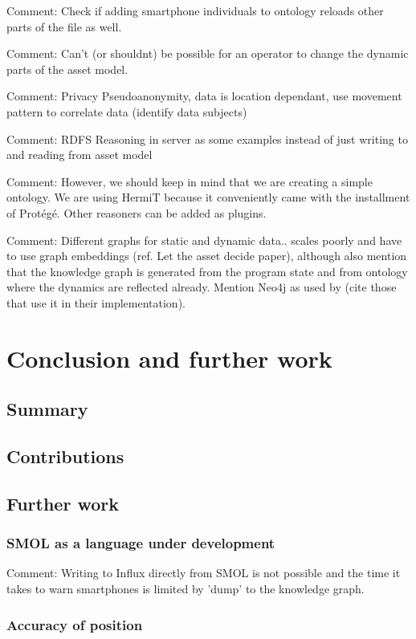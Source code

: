 \documentclass{article}
\begin{document}
Comment: Check if adding smartphone individuals to ontology reloads other parts of the file as well.

Comment: Can't (or shouldnt) be possible for an operator to change the dynamic parts of the asset model.

Comment: Privacy
    Pseudoanonymity, data is location dependant, use movement pattern to correlate data (identify data subjects)


Comment: RDFS Reasoning in server as some examples instead of just writing to and reading from asset model

Comment: However, we should keep in mind that we are creating a simple ontology. We are using HermiT because it conveniently came with the installment of Protégé. Other reasoners can be added as plugins.

Comment: Different graphs for static and dynamic data.. scales poorly and have to use graph embeddings (ref. Let the asset decide paper), although also mention that the knowledge graph is generated from the program state and from ontology where the dynamics are reflected already. Mention Neo4j as used by (cite those that use it in their implementation).




\newpage
\section{Conclusion and further work}\label{sec:Conclusion}
\subsection{Summary}
\subsection{Contributions}
\subsection{Further work}
\subsubsection{SMOL as a language under development}
Comment: Writing to Influx directly from SMOL is not possible and the time it takes to warn smartphones is limited by 'dump' to the knowledge graph.
\subsubsection{Accuracy of position}
\end{document}
